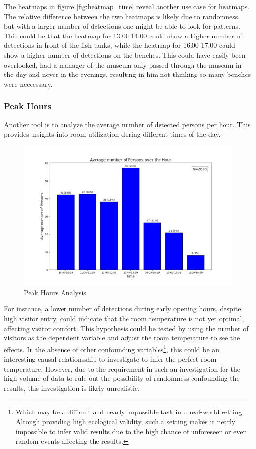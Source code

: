 The heatmaps in figure \ref{fig:heatmap_time} reveal another use case for heatmaps. The relative difference between the two heatmaps is likely due to randomness, but with a larger number of detections one might be able to look for patterns. This could be that the heatmap for 13:00-14:00 could show a higher number of detections in front of the fish tanks, while the heatmap for 16:00-17:00 could show a higher number of detections on the benches. This could have easily been overlooked, had a manager of the museum only passed through the museum in the day and never in the evenings, resulting in him not thinking so many benches were neccessary. 



\subsubsection{Peak Hours}
\label{sec:peak_hours}
Another tool is to analyze the average number of detected persons per hour. This provides insights into room utilization during different times of the day.

\begin{figure}[H]
	\centering
	\includegraphics[width=1\textwidth]{Images/Analytics/peak_hours.png}
	\caption{Peak Hours Analysis}
    \label{fig:peak_hours}
\end{figure}

For instance, a lower number of detections during early opening hours, despite high visitor entry, could indicate that the room temperature is not yet optimal, affecting visitor comfort. This hypothesis could be tested by using the number of visitors as the dependent variable and adjust the room temperature to see the effects. In the absence of other confounding variables\footnote{Which may be a difficult and nearly impossible task in a real-world setting. Altough providing high ecological validity, such a setting makes it nearly impossible to infer valid results due to the high chance of unforeseen or even random events affecting the results.}, this could be an interesting causal relationsship to investigate to infer the perfect room temperature. However, due to the requirement in such an investigation for the high volume of data to rule out the possibility of randomness confounding the results, this investigation is likely unrealistic.


